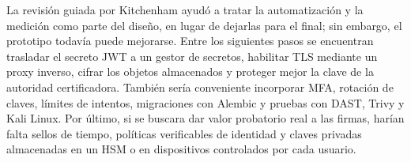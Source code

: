 \documentclass[conference]{IEEEtran}
\begin{document}
La revisión guiada por Kitchenham ayudó a tratar la automatización y la medición como parte del diseño, en lugar de dejarlas para el final; sin embargo, el prototipo todavía puede mejorarse. Entre los siguientes pasos se encuentran trasladar el secreto JWT a un gestor de secretos, habilitar TLS mediante un proxy inverso, cifrar los objetos almacenados y proteger mejor la clave de la autoridad certificadora. También sería conveniente incorporar MFA, rotación de claves, límites de intentos, migraciones con Alembic y pruebas con DAST, Trivy y Kali Linux. Por último, si se buscara dar valor probatorio real a las firmas, harían falta sellos de tiempo, políticas verificables de identidad y claves privadas almacenadas en un HSM o en dispositivos controlados por cada usuario.



\end{document}
